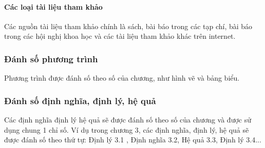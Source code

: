 \paragraph{Các loại tài liệu tham khảo} \mbox{} %

Các nguồn tài liệu tham khảo chính là sách, bài báo trong các tạp chí, bài báo trong các hội nghị khoa học và các tài liệu tham khảo khác trên internet.
\subsubsection{Đánh số phương trình}
Phương trình được đánh số theo số của chương, như hình vẽ và bảng biểu.
\subsubsection{Đánh số định nghĩa, định lý, hệ quả}
Các định nghĩa định lý hệ quả sẽ được đánh số theo số của chương và được sử dụng chung 1 chỉ số. Ví dụ trong chương 3, các định nghĩa, định lý, hệ quả sẽ được đánh số theo thứ tự: Định lý 3.1 , Định nghĩa 3.2, Hệ quả 3.3, Định lý 3.4...

\cleardoublepage